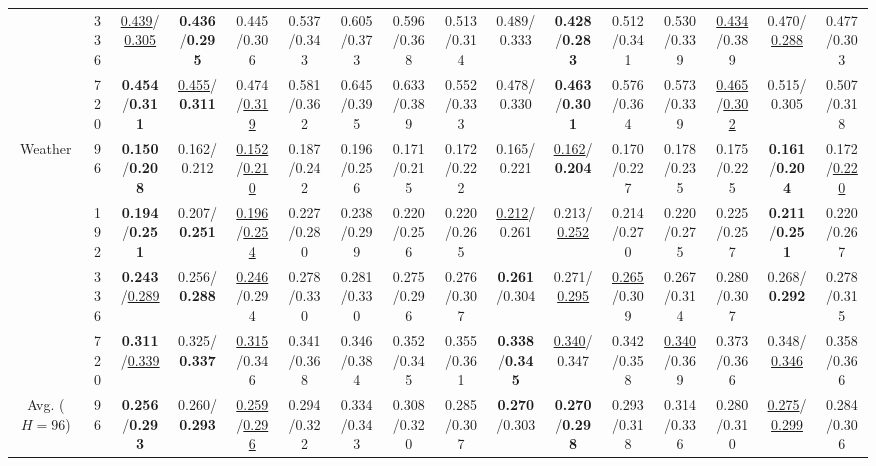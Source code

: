 \begin{table}[t]
{\begin{tabular}{@{}cc@{\hspace{5pt}}*{7}{c}@{\hspace{8pt}}*{7}{c}@{}}
 & 336 & \uline{0.439}/\uline{0.305} & \textbf{0.436}/\textbf{0.295} & 0.445/0.306 & 0.537/0.343 & 0.605/0.373 & 0.596/0.368 & 0.513/0.314 & 0.489/0.333 & \textbf{0.428}/\textbf{0.283} & 0.512/0.341 & 0.530/0.339 & \uline{0.434}/0.389 & 0.470/\uline{0.288} & 0.477/0.303 \\
 & 720 & \textbf{0.454}/\textbf{0.311} & \uline{0.455}/\textbf{0.311} & 0.474/\uline{0.319} & 0.581/0.362 & 0.645/0.395 & 0.633/0.389 & 0.552/0.333 & 0.478/0.330 & \textbf{0.463}/\textbf{0.301} & 0.576/0.364 & 0.573/0.339 & \uline{0.465}/\uline{0.302} & 0.515/0.305 & 0.507/0.318 \\
\midrule
\multirow{4}{*}{Weather} & 96 & \textbf{0.150}/\textbf{0.208} & 0.162/0.212 & \uline{0.152}/\uline{0.210} & 0.187/0.242 & 0.196/0.256 & 0.171/0.215 & 0.172/0.222 & 0.165/0.221 & \uline{0.162}/\textbf{0.204} & 0.170/0.227 & 0.178/0.235 & 0.175/0.225 & \textbf{0.161}/\textbf{0.204} & 0.172/\uline{0.220} \\
 & 192 & \textbf{0.194}/\textbf{0.251} & 0.207/\textbf{0.251} & \uline{0.196}/\uline{0.254} & 0.227/0.280 & 0.238/0.299 & 0.220/0.256 & 0.220/0.265 & \uline{0.212}/0.261 & 0.213/\uline{0.252} & 0.214/0.270 & 0.220/0.275 & 0.225/0.257 & \textbf{0.211}/\textbf{0.251} & 0.220/0.267 \\
 & 336 & \textbf{0.243}/\uline{0.289} & 0.256/\textbf{0.288} & \uline{0.246}/0.294 & 0.278/0.330 & 0.281/0.330 & 0.275/0.296 & 0.276/0.307 & \textbf{0.261}/0.304 & 0.271/\uline{0.295} & \uline{0.265}/0.309 & 0.267/0.314 & 0.280/0.307 & 0.268/\textbf{0.292} & 0.278/0.315 \\
 & 720 & \textbf{0.311}/\uline{0.339} & 0.325/\textbf{0.337} & \uline{0.315}/0.346 & 0.341/0.368 & 0.346/0.384 & 0.352/0.345 & 0.355/0.361 & \textbf{0.338}/\textbf{0.345} & \uline{0.340}/0.347 & 0.342/0.358 & \uline{0.340}/0.369 & 0.373/0.366 & 0.348/\uline{0.346} & 0.358/0.366 \\
\midrule
Avg. ($H=96$) & 96 & \textbf{0.256}/\textbf{0.293} & 0.260/\textbf{0.293} & \uline{0.259}/\uline{0.296} & 0.294/0.322 & 0.334/0.343 & 0.308/0.320 & 0.285/0.307 & \textbf{0.270}/0.303 & \textbf{0.270}/\textbf{0.298} & 0.293/0.318 & 0.314/0.336 & 0.280/0.310 & \uline{0.275}/\uline{0.299} & 0.284/0.306 \\
\bottomrule
\end{tabular}%
}
\endgroup
\end{table}
